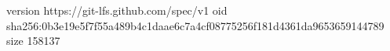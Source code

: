 version https://git-lfs.github.com/spec/v1
oid sha256:0b3e19e5f7f55a489b4c1daae6c7a4cf08775256f181d4361da9653659144789
size 158137
